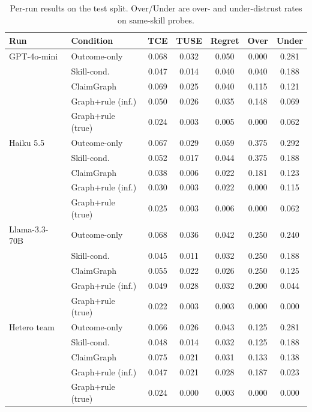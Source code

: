 \documentclass[letterpaper]{article}
\begin{document}
\begin{table}[t]
\centering\scriptsize
\setlength{\tabcolsep}{2.4pt}
\begin{tabular}{llccccc}
\toprule
Run & Condition & TCE & TUSE & Regret & Over & Under\\
\midrule
GPT-4o-mini & Outcome-only & 0.068 & 0.032 & 0.050 & 0.000 & 0.281 \\
 & Skill-cond. & 0.047 & 0.014 & 0.040 & 0.040 & 0.188 \\
 & ClaimGraph & 0.069 & 0.025 & 0.040 & 0.115 & 0.121 \\
 & Graph+rule (inf.) & 0.050 & 0.026 & 0.035 & 0.148 & 0.069 \\
 & Graph+rule (true) & 0.024 & 0.003 & 0.005 & 0.000 & 0.062 \\
\midrule
Haiku 5.5 & Outcome-only & 0.067 & 0.029 & 0.059 & 0.375 & 0.292 \\
 & Skill-cond. & 0.052 & 0.017 & 0.044 & 0.375 & 0.188 \\
 & ClaimGraph & 0.038 & 0.006 & 0.022 & 0.181 & 0.123 \\
 & Graph+rule (inf.) & 0.030 & 0.003 & 0.022 & 0.000 & 0.115 \\
 & Graph+rule (true) & 0.025 & 0.003 & 0.006 & 0.000 & 0.062 \\
\midrule
Llama-3.3-70B & Outcome-only & 0.068 & 0.036 & 0.042 & 0.250 & 0.240 \\
 & Skill-cond. & 0.045 & 0.011 & 0.032 & 0.250 & 0.188 \\
 & ClaimGraph & 0.055 & 0.022 & 0.026 & 0.250 & 0.125 \\
 & Graph+rule (inf.) & 0.049 & 0.028 & 0.032 & 0.200 & 0.044 \\
 & Graph+rule (true) & 0.022 & 0.003 & 0.003 & 0.000 & 0.000 \\
\midrule
Hetero team & Outcome-only & 0.066 & 0.026 & 0.043 & 0.125 & 0.281 \\
 & Skill-cond. & 0.048 & 0.014 & 0.032 & 0.125 & 0.188 \\
 & ClaimGraph & 0.075 & 0.021 & 0.031 & 0.133 & 0.138 \\
 & Graph+rule (inf.) & 0.047 & 0.021 & 0.028 & 0.187 & 0.023 \\
 & Graph+rule (true) & 0.024 & 0.000 & 0.003 & 0.000 & 0.000 \\
\bottomrule
\end{tabular}
\caption{Per-run results on the test split. Over/Under are over- and under-distrust rates on same-skill probes.}
\label{tab:runs}
\end{table}
\end{document}
